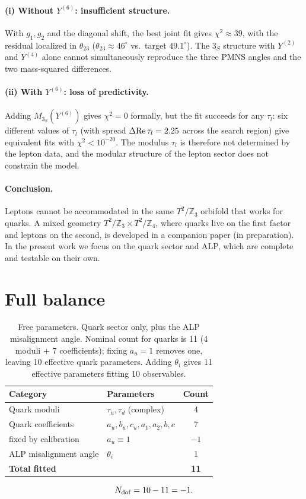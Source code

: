 \documentclass[12pt,a4paper]{article}
\numberwithin{equation}{section}
\begin{document}
\paragraph{(i) Without \(Y^{(6)}\): insufficient structure.}
With \(g_1,g_2\) and the diagonal shift, the best joint fit gives \(\chi^2\approx 39\), with the residual localized in \(\theta_{23}\) (\(\theta_{23}\approx 46^\circ\) vs.\ target \(49.1^\circ\)). The \(3_S\) structure with \(Y^{(2)}\) and \(Y^{(4)}\) alone cannot simultaneously reproduce the three PMNS angles and the two mass-squared differences.

\paragraph{(ii) With \(Y^{(6)}\): loss of predictivity.}
Adding \(M_{3_S}(Y^{(6)})\) gives \(\chi^2 = 0\) formally, but the fit succeeds for any \(\tau_l\): six different values of \(\tau_l\) (with spread \(\Delta{\rm Re}\,\tau_l = 2.25\) across the search region) give equivalent fits with \(\chi^2< 10^{-20}\). The modulus \(\tau_l\) is therefore not determined by the lepton data, and the modular structure of the lepton sector does not constrain the model.

\paragraph{Conclusion.}
Leptons cannot be accommodated in the same \(T^2/\mathbb{Z}_3\) orbifold that works for quarks. A mixed geometry \(T^2/\mathbb{Z}_3 \times T^2/\mathbb{Z}_4\), where quarks live on the first factor and leptons on the second, is developed in a companion paper (in preparation). In the present work we focus on the quark sector and ALP, which are complete and testable on their own.

\section{Full balance}
\begin{table}[H]
\centering
\caption{Free parameters. Quark sector only, plus the ALP misalignment angle. Nominal count for quarks is 11 (4 moduli + 7 coefficients); fixing \(a_u = 1\) removes one, leaving 10 effective quark parameters. Adding \(\theta_i\) gives 11 effective parameters fitting 10 observables.}
\begin{tabular}{llc}
\toprule
Category & Parameters & Count \\
\midrule
Quark moduli & \(\tau_u, \tau_d\) (complex) & 4 \\
Quark coefficients & \(a_u, b_u, c_u, a_1, a_2, b, c\) & 7 \\
\quad fixed by calibration & \(a_u \equiv 1\) & \(-1\) \\
ALP misalignment angle & \(\theta_i\) & 1 \\
\midrule
\textbf{Total fitted} & & \textbf{11} \\
\bottomrule
\end{tabular}
\end{table}
\begin{equation}
N_{\rm dof} = 10 - 11 = -1.
\end{equation}
\end{document}
